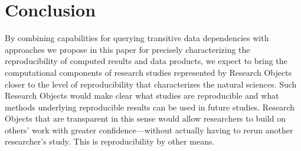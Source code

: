 \section{Conclusion}\label{sec-conclusion}

By combining capabilities for querying transitive data dependencies with
	approaches we propose in this paper for precisely characterizing the reproducibility
	of computed
	results and data products, we expect to bring the computational components of research
	studies represented by Research Objects
	closer to the level of reproducibility that characterizes the natural sciences.
Such Research Objects would make clear what studies are reproducible and what methods
	underlying reproducible
	results can be used in future studies.
Research Objects that are transparent in this sense would allow researchers to build
	on others' work with greater confidence---without
	actually having to rerun another researcher's study.
This is reproducibility by other means.
